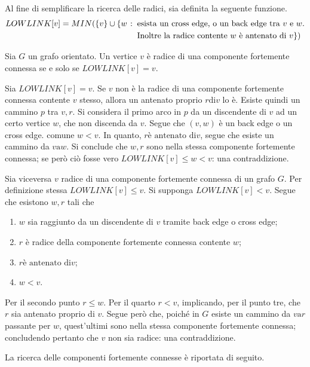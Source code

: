 \documentclass{subfiles}
\begin{document}
\noindent Al fine di semplificare la ricerca delle radici, sia definita la seguente funzione.
\[
    \begin{aligned}
        LOWLINK[v] = MIN(\Set{v} \cup \{w \such & \text{esista un cross edge, o un back edge tra} v \text{e} w. \\
                                                & \text{Inoltre la radice contente} w \text{è antenato di} v\}) \\
    \end{aligned}
\]
\clearpage

\begin{Lemma}
    Sia \(G\) un grafo orientato. Un vertice \(v\) è radice di una componente fortemente connessa se e solo se \(LOWLINK[v] = v\).
    \begin{Proof*}
        Sia \(LOWLINK[v] = v\). Se \(v\) non è la radice di una componente fortemente connessa contente \(v\) stesso, allora un antenato proprio \(r \text{di} v\) lo è.
        Esiste quindi un cammino \(p\) tra \(v, r\). Si considera il primo arco in \(p\) da un discendente di \(v\) ad un certo vertice \(w\), che non discenda da \(v\).
        Segue che \((v, w)\) è un back edge o un cross edge. comune \(w < v\). In quanto, \(r \text{è antenato di} v\),
        segue che esiste un cammino da \(v \text{a} w\).
        Si conclude che \(w,r\) sono nella stessa componente fortemente connessa; se però ciò fosse vero \(LOWLINK[v] \le w < v\): una contraddizione.

        Sia viceversa \(v\) radice di una componente fortemente connessa di un grafo \(G\).
        Per definizione stessa \(LOWLINK[v] \le v\). Si supponga \(LOWLINK[v] < v\).
        Segue che esistono \(w, r\) tali che
        \begin{enumerate}
            \item \(w\) sia raggiunto da un discendente di \(v\) tramite back edge o cross edge;
            \item \(r\) è radice della componente fortemente connessa contente \(w\);
            \item \(r \text{è antenato di} v\);
            \item \(w < v\).
        \end{enumerate}

        \noindent Per il secondo punto \(r \le w\). Per il quarto \(r < v\), implicando, per il punto tre, che \(r\) sia antenato proprio di \(v\).
        Segue però che, poiché in \(G\) esiste un cammino da \(v \text{a} r\) passante per \(w\), quest'ultimi sono nella stessa componente fortemente connessa;
        concludendo pertanto che \(v\) non sia radice: una contraddizione.
    \end{Proof*}
\end{Lemma}

\noindent La ricerca delle componenti fortemente connesse è riportata di seguito.

\end{document}
